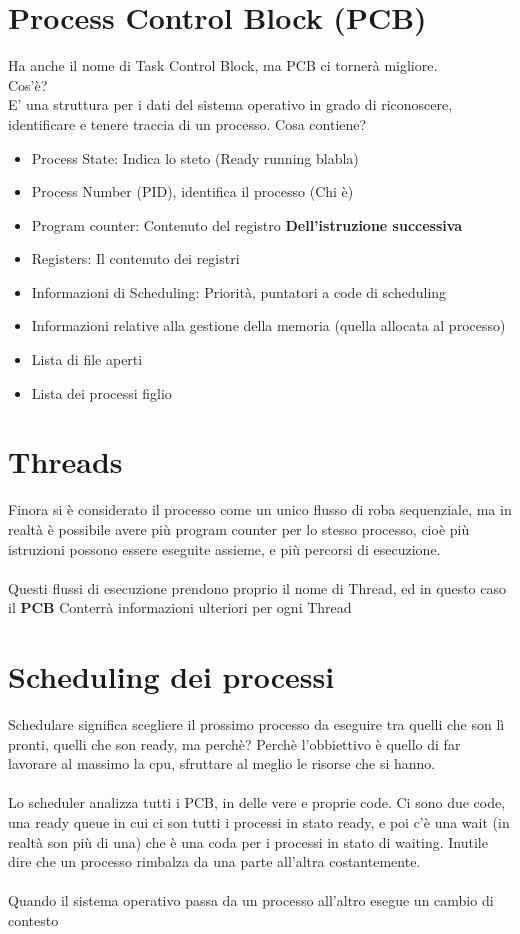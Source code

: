 \documentclass[12pt, a4paper, openany, twoside]{book}
\begin{document}
\section{Process Control Block (PCB)}
Ha anche il nome di Task Control Block, ma PCB ci tornerà migliore. \\
Cos'è? \\
E' una struttura per i dati del sistema operativo in grado di riconoscere, 
identificare e tenere traccia di un processo.
Cosa contiene?\\ 
\begin{itemize}
	\item Process State: Indica lo steto (Ready running blabla)
	\item Process Number (PID), identifica il processo (Chi è)
	\item Program counter: Contenuto del registro \color{red} \textbf{Dell'istruzione
	successiva} \color{black}
	\item Registers: Il contenuto dei registri
	\item Informazioni di Scheduling: Priorità, puntatori a code di scheduling
	\item Informazioni relative alla gestione della memoria (quella allocata al processo)
	\item Lista di file aperti
	\item Lista dei processi figlio
\end{itemize}
\section{Threads}
Finora si è considerato il processo come un unico flusso di roba sequenziale,
ma in realtà è possibile avere più program counter per lo stesso processo, cioè
più istruzioni possono essere eseguite assieme, e più percorsi di esecuzione.
\\ \\
Questi flussi di esecuzione prendono proprio il nome di Thread, ed in questo caso
il \textbf{PCB} Conterrà informazioni ulteriori per ogni Thread  
\section{Scheduling dei processi}
Schedulare significa scegliere il prossimo processo da eseguire tra quelli che 
son lì pronti, quelli che son ready, ma perchè? Perchè l'obbiettivo è quello di 
far lavorare al massimo la cpu, sfruttare al meglio le risorse che si hanno. \\
\\ 
Lo scheduler analizza tutti i PCB, in delle vere e proprie code. Ci sono due code,
una ready queue in cui ci son tutti i processi in stato ready, e poi c'è una 
wait (in realtà son più di una) che è una coda per i processi in stato di waiting.
Inutile dire che un processo rimbalza da una parte all'altra costantemente.
\\ \\
Quando il sistema operativo passa da un processo all'altro esegue un cambio
di contesto 
\end{document}

